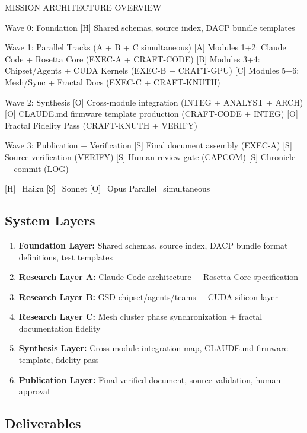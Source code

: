 \documentclass[11pt,letterpaper]{article}
\begin{document}
\begin{asciibox}
MISSION ARCHITECTURE OVERVIEW

  Wave 0: Foundation
    [H] Shared schemas, source index, DACP bundle templates
  
  Wave 1: Parallel Tracks (A + B + C simultaneous)
    [A] Modules 1+2: Claude Code + Rosetta Core (EXEC-A + CRAFT-CODE)
    [B] Modules 3+4: Chipset/Agents + CUDA Kernels (EXEC-B + CRAFT-GPU)
    [C] Modules 5+6: Mesh/Sync + Fractal Docs (EXEC-C + CRAFT-KNUTH)
  
  Wave 2: Synthesis
    [O] Cross-module integration (INTEG + ANALYST + ARCH)
    [O] CLAUDE.md firmware template production (CRAFT-CODE + INTEG)
    [O] Fractal Fidelity Pass (CRAFT-KNUTH + VERIFY)
  
  Wave 3: Publication + Verification
    [S] Final document assembly (EXEC-A)
    [S] Source verification (VERIFY)
    [S] Human review gate (CAPCOM)
    [S] Chronicle + commit (LOG)
  
  [H]=Haiku  [S]=Sonnet  [O]=Opus  Parallel=simultaneous
\end{asciibox}

\subsection{System Layers}

\begin{enumerate}
  \item \textbf{Foundation Layer:} Shared schemas, source index, DACP bundle format definitions, test templates
  \item \textbf{Research Layer A:} Claude Code architecture + Rosetta Core specification
  \item \textbf{Research Layer B:} GSD chipset/agents/teams + CUDA silicon layer
  \item \textbf{Research Layer C:} Mesh cluster phase synchronization + fractal documentation fidelity
  \item \textbf{Synthesis Layer:} Cross-module integration map, CLAUDE.md firmware template, fidelity pass
  \item \textbf{Publication Layer:} Final verified document, source validation, human approval
\end{enumerate}

\subsection{Deliverables}
\end{document}
